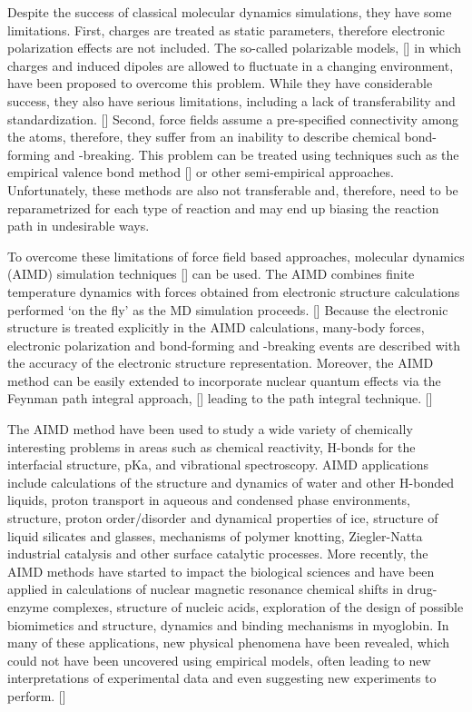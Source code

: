 Despite the success of classical molecular dynamics simulations, they  have some limitations. First, charges
are treated as static parameters, therefore electronic polarization effects are
not included.  The so-called polarizable models, [\cite{Rick94,SWR02,Lamoureux03}] in which charges 
and induced dipoles are allowed to fluctuate in a changing environment, 
have been proposed to overcome this problem. 
While they have considerable success, they also have serious limitations, including a lack of transferability 
and standardization. [\cite{TME02}] Second, force fields assume a pre-specified connectivity among the atoms, therefore, they suffer
from an inability to describe chemical bond-forming and -breaking. This problem
can be treated using techniques such as the empirical valence
bond method [\cite{AW80}] or other semi-empirical approaches. Unfortunately, these methods are also not
transferable and, therefore, need to be reparametrized for each type of reaction and may end
up biasing the reaction path in undesirable ways.

To overcome these limitations of force field based approaches, \abinitio molecular dynamics (AIMD) simulation techniques [\cite{DKR90,MCP92,Allen1993,MET96,MP97,DM00,RC02}] 
can be used. The AIMD combines finite temperature dynamics with forces
obtained from electronic structure calculations performed ‘on the fly’ as the MD simulation
proceeds. [\cite{DM00}] Because the electronic structure is treated explicitly in the AIMD calculations,
many-body forces, electronic polarization and bond-forming and -breaking events are described
with the accuracy of the electronic structure representation. Moreover, the AIMD
method can be easily extended to incorporate nuclear quantum effects via the Feynman
path integral approach, [\cite{RPF65,RPF72}] leading to the \abinitio path integral technique. [\cite{DM96,MT96,DM99}]

The AIMD method have been used to study a wide variety of chemically
interesting problems in areas such as chemical reactivity, H-bonds for the interfacial structure, pKa,
and vibrational spectroscopy. AIMD applications include calculations of the structure and dynamics of water and other H-bonded liquids, 
proton transport in aqueous and condensed phase environments, structure, proton order/disorder and dynamical properties of ice, structure of
liquid silicates and glasses, mechanisms of polymer knotting, Ziegler-Natta industrial catalysis
and other surface catalytic processes. 
More recently, the AIMD methods have started to impact the
biological sciences and have been applied in calculations of nuclear magnetic resonance chemical shifts in 
drug-enzyme complexes, structure of nucleic acids, exploration of the design of possible
biomimetics and structure, dynamics and binding mechanisms in myoglobin.
In many of these applications, new physical phenomena have been revealed, which could
not have been uncovered using empirical models, often leading to new interpretations of
experimental data and even suggesting new experiments to perform. [\cite{TME02}]

